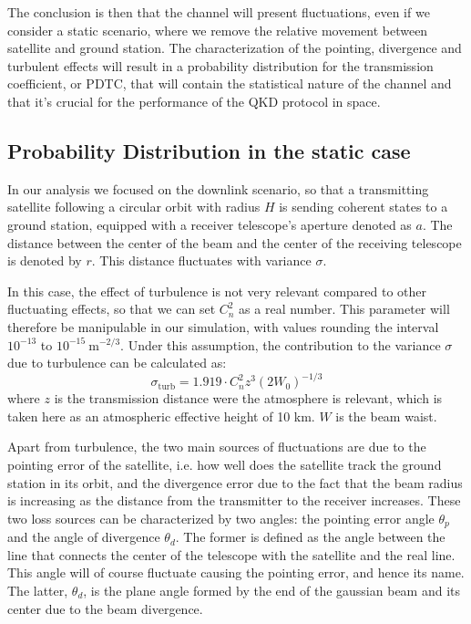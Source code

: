\documentclass[%
 reprint,
 amsmath,amssymb,
 aps,
]{revtex4-1}
\begin{document}
The conclusion is then that the channel will present fluctuations, even if we consider a static scenario, where we remove the relative movement between satellite and ground station. The characterization of the pointing, divergence and turbulent effects will result in a probability distribution for the transmission coefficient, or PDTC, that will contain the statistical nature of the channel and that it's crucial for the performance of the QKD protocol in space.

\subsection{Probability Distribution in the static case}

In our analysis we focused on the downlink scenario, so that a transmitting satellite following a circular orbit with radius $H$ is sending coherent states to a ground station, equipped with a receiver telescope's aperture denoted as $a$. The distance between the center of the beam and the center of the receiving telescope is denoted by $r$. This distance fluctuates with variance $\sigma$.

In this case, the effect of turbulence is not very relevant compared to other fluctuating effects, so that we can set $C_n^2$ as a real number. This parameter will therefore be manipulable in our simulation, with values rounding the interval $10^{-13}$ to $10^{-15}\ \mathrm{m^{-2/3}}$. Under this assumption, the contribution to the variance $\sigma$ due to turbulence can be calculated as:
\begin{equation}
    \sigma_{\mathrm{turb}} = 1.919\cdot C_n^2z^3(2W_0)^{-1/3}
\end{equation}
where $z$ is the transmission distance were the atmosphere is relevant, which is taken here as an atmospheric effective height of 10 km. $W$ is the beam waist.

Apart from turbulence, the two main sources of fluctuations are due to the pointing error of the satellite, i.e. how well does the satellite track the ground station in its orbit, and the divergence error due to the fact that the beam radius is increasing as the distance from the transmitter to the receiver increases. These two loss sources can be characterized by two angles: the pointing error angle $\theta_p$ and the angle of divergence $\theta_d$. The former is defined as the angle between the line that connects the center of the telescope with the satellite and the real line. This angle will of course fluctuate causing the pointing error, and hence its name. The latter, $\theta_d$, is the plane angle formed by the end of the gaussian beam and its center due to the beam divergence.
\end{document}

